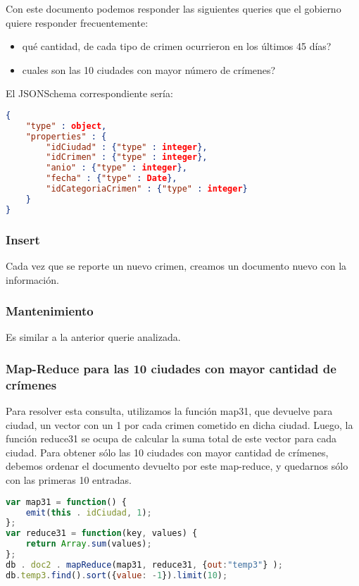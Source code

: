 \documentclass[11pt, a4paper]{article}
\begin{document}
Con este documento podemos responder las siguientes queries que el gobierno quiere responder frecuentemente:
\begin{itemize}
	\item qué cantidad, de cada tipo de crimen ocurrieron en los últimos 45 días?
	\item cuales son las 10 ciudades con mayor número de crímenes?
\end{itemize}

El JSONSchema correspondiente sería:
\begin{lstlisting}[language=json]
{
	"type" : object,
	"properties" : {
		"idCiudad" : {"type" : integer},
		"idCrimen" : {"type" : integer},
		"anio" : {"type" : integer},
		"fecha" : {"type" : Date},
		"idCategoriaCrimen" : {"type" : integer}
	}
}
\end{lstlisting}

\subsubsection{Insert}

Cada vez que se reporte un nuevo crimen, creamos un documento nuevo con la informaci\'on.

\subsubsection{Mantenimiento}

Es similar a la anterior querie analizada.

\subsubsection{Map-Reduce para las 10 ciudades con mayor cantidad de crímenes}

Para resolver esta consulta, utilizamos la función map31, que devuelve para ciudad, un vector con un 1 por cada crimen cometido en dicha ciudad. Luego, la función reduce31 se ocupa de calcular la suma total de este vector para cada ciudad. Para obtener sólo las 10 ciudades con mayor cantidad de crímenes, debemos ordenar el documento devuelto por este map-reduce, y quedarnos sólo con las primeras 10 entradas.

\begin{lstlisting}[language=JavaScript]
var map31 = function() {
    emit(this . idCiudad, 1);
};
var reduce31 = function(key, values) {
    return Array.sum(values);
};
db . doc2 . mapReduce(map31, reduce31, {out:"temp3"} );
db.temp3.find().sort({value: -1}).limit(10);
\end{lstlisting}
\end{document}
